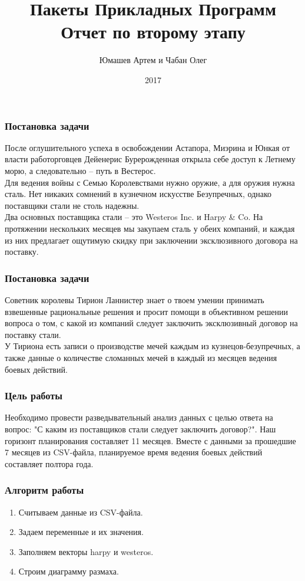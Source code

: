 \documentclass[10pt]{beamer}
\title{Пакеты Прикладных Программ \\ Отчет по второму этапу}
\author{Юмашев Артем и Чабан Олег}
\institute{ВМК МГУ}
\date{2017}
\begin{document}
 
\frame{\titlepage}
 
\begin{frame}
\frametitle{Постановка задачи}
После оглушительного успеха в освобождении Астапора, Миэрина и Юнкая от власти работорговцев Дейенерис Бурерожденная открыла себе доступ к Летнему морю, а следовательно -- путь в Вестерос.\\
Для ведения войны с Семью Королевствами нужно оружие, а для оружия нужна сталь. Нет никаких сомнений в кузнечном искусстве Безупречных, однако поставщики стали не столь надежны.\\
Два основных поставщика стали -- это {Westeros Inc.} и {Harpy \& Co}. На протяжении нескольких месяцев мы закупаем сталь у обеих компаний, и каждая из них предлагает ощутимую скидку при заключении эксклюзивного договора на поставку.\\
\end{frame}

\begin{frame}
\frametitle{Постановка задачи}
Советник королевы Тирион Ланнистер знает о твоем умении принимать взвешенные рациональные решения и просит помощи в объективном решении вопроса о том, с какой из компаний следует заключить эксклюзивный договор на поставку стали.\\
У Тириона есть записи о производстве мечей каждым из кузнецов-безупречных, а также данные о количестве сломанных мечей в каждый из месяцев ведения боевых действий.\\
\end{frame}
 
\begin{frame}
\frametitle{Цель работы}
Необходимо провести разведывательный анализ данных с целью ответа на вопрос: "С каким из поставщиков стали следует заключить договор?". Наш горизонт планирования составляет 11 месяцев. Вместе с данными за прошедшие 7 месяцев из CSV-файла, планируемое время ведения боевых действий составляет полтора года.
\end{frame}

\begin{frame}
\frametitle{Алгоритм работы}
\begin{enumerate}
\item Считываем данные из CSV-файла.
\item Задаем переменные и их значения.
\item Заполняем векторы harpy и westeros.
\item Строим диаграмму размаха.
\end{enumerate}
\end{frame}
\end{document}
